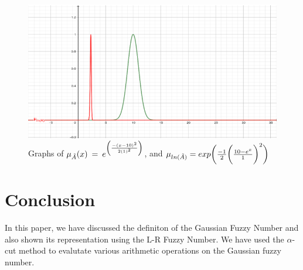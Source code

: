 \documentclass{article}
\begin{document}
\begin{figure}[h]
    \centering
    \includegraphics[scale=0.7]{gaussian_ln.png}
    \caption{\label{fig:ln_img} Graphs of $\mu_{\Tilde{A}}(x) \:=\:e^{\left( \frac{-(x-10)^2}{2(1)^{2}} \right)}$, and $\mu_{ln({\Tilde{A}})}=exp\biggl(\frac{-1}{2}\biggl({\frac{10-e^{x}}{1}}\biggr)^2\biggr)$}
    
    \label{fig:ln_img}
\end{figure}
\section{Conclusion}
In this paper, we have discussed the definiton of the Gaussian Fuzzy Number and also shown its representation using the L-R Fuzzy Number. We have used the $\alpha$-cut method to evalutate various arithmetic operations on the Gaussian fuzzy number.


\end{document}
